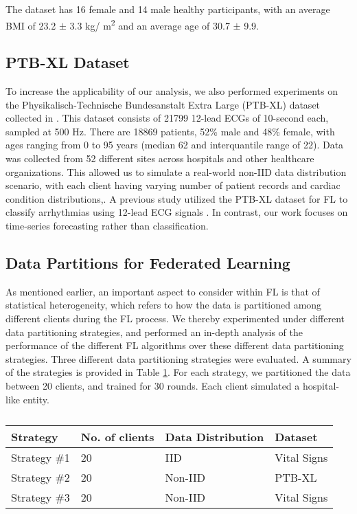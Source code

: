 The dataset has 16 female and 14 male healthy participants, with an average BMI of 23.2 $ \pm $ 3.3 kg/
m\textsuperscript{2} and an average age of 30.7 $ \pm $ 9.9. 


\subsection{PTB-XL Dataset}
To increase the applicability of our analysis, we also performed experiments on the Physikalisch-Technische Bundesanstalt Extra Large (PTB-XL) dataset collected in \cite{ptb-xl}.
This dataset consists of 21799 12-lead ECGs of 10-second each, sampled at 500 Hz.
There are 18869 patients, 52\% male and 48\% female, with ages ranging from 0 to 95 years (median 62 and interquantile range of 22). Data was collected from 52 different sites across hospitals and other healthcare organizations. 
This allowed us to simulate a real-world non-IID data distribution scenario, with each client having varying number of patient records and cardiac condition distributions,.
A previous study utilized the PTB-XL dataset for FL to classify arrhythmias using 12-lead ECG signals \cite{10.1007/978-3-031-49361-4_3}.
In contrast, our work focuses on time-series forecasting rather than classification.

\subsection{Data Partitions for Federated Learning}
As mentioned earlier, an important aspect to consider within FL is that of statistical heterogeneity, which refers to how the data is partitioned among different clients during the FL process. 
We thereby experimented under different data partitioning strategies, and performed an in-depth analysis of the performance of the different FL algorithms over these different data partitioning strategies. 
Three different data partitioning strategies were evaluated. 
A summary of the strategies is provided in Table \ref{tab:data_partitions}. 
For each strategy, we partitioned the data between 20 clients, and trained for 30 rounds.
Each client simulated a hospital-like entity.

\begin{table}
  \caption{}
  \label{tab:data_partitions}
  \centering
  \begin{tabular}{l  l  l  l}
    \toprule 
    \textbf{Strategy}  & \textbf{No. of clients}   & \textbf{Data Distribution} & \textbf{Dataset} \\    
    \midrule
    Strategy \#1       & 20                         & IID                        & Vital Signs    \\
    \hline
    Strategy \#2       & 20                         & Non-IID                      & PTB-XL \\
    \hline
    Strategy \#3       & 20                         & Non-IID                      & Vital Signs \\
    
    \bottomrule
  \end{tabular}
\end{table}


